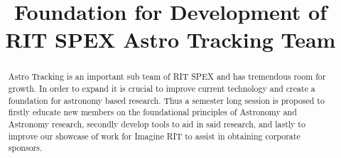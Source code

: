 \documentclass[conference]{IEEEtran} %
\title{Foundation for Development of RIT SPEX Astro Tracking Team}
\author{
  \IEEEauthorblockN{%
    Evan~Putnam\IEEEauthorrefmark{1},  %
    Marilyn~Wolbert\IEEEauthorrefmark{2}
  }
  \IEEEauthorblockA{%
    RIT Space Exploration, Rochester Institute of Technology \\ %
    Rochester, N.Y. \\
    Email:
    \IEEEauthorrefmark{1}emp9173@rit.edu,
    \IEEEauthorrefmark{2}mxw3196@rit.edu
  }

}
\begin{document}
\maketitle%

\begin{abstract}

Astro Tracking is an important sub team of RIT SPEX and has tremendous room for growth.  In order to expand it is crucial to improve current technology and create a foundation for astronomy based research.  Thus a semester long session is proposed to firstly educate new members on the foundational principles of Astronomy and Astronomy research, secondly develop tools to aid in said research, and lastly to improve our showcase of work for Imagine RIT to assist in obtaining corporate sponsors.

\end{abstract}

\label{sec:nomenclature}
\newcommand{\nomunit}[1]{%
\renewcommand{\nomentryend}{\hspace*{\fill}#1}}
\renewcommand{\nompreamble}{

  }
\end{document}

